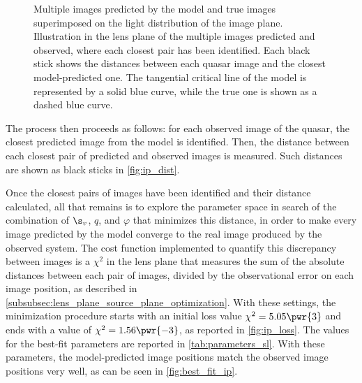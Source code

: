 \begin{figure}
  \begin{minipage}{\linewidth}
    \centering
  \end{minipage}
  \begin{minipage}{\linewidth}
    \centering
\end{minipage}
\caption[Multiple images prediction for image plane optimization]{\protect{} Multiple images predicted by the model and true images superimposed on the light distribution of the image plane. \protect{} Illustration in the lens plane of the multiple images predicted and observed, where each closest pair has been identified. Each black stick shows the distances between each quasar image and the closest model-predicted one. The tangential critical line of the model is represented by a solid blue curve, while the true one is shown as a dashed blue curve.}
  \label{fig:ip_preds}
\end{figure}

The process then proceeds as follows: for each observed image of the quasar, the closest predicted image from the model is identified. Then, the distance between each closest pair of predicted and observed images is measured. Such distances are shown as black sticks in \cref{fig:ip_dist}.

Once the closest pairs of images have been identified and their distance calculated, all that remains is to explore the parameter space in search of the combination of $\s_v$, $q$, and $\varphi$ that minimizes this distance, in order to make every image predicted by the model converge to the real image produced by the observed system. The cost function implemented to quantify this discrepancy between images is a $\chi^2$ in the lens plane that measures the sum of the absolute distances between each pair of images, divided by the observational error on each image position, as described in \cref{subsubsec:lens_plane_source_plane_optimization}.
With these settings, the minimization procedure starts with an initial loss value $\chi^2 = 5.05\pwr{3}$ and ends with a value of $\chi^2 = 1.56\pwr{-3}$, as reported in \cref{fig:ip_loss}. The values for the best-fit parameters are reported in \cref{tab:parameters_sl}. With these parameters, the model-predicted image positions match the observed image positions very well, as can be seen in \cref{fig:best_fit_ip}.

